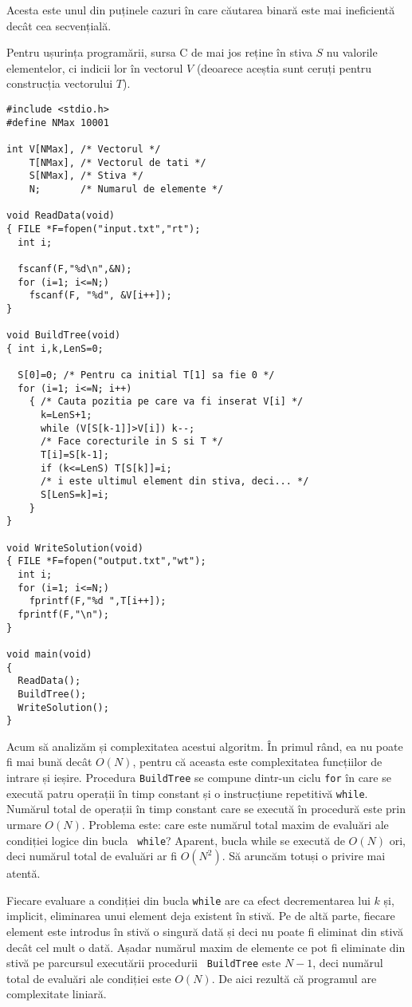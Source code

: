 Acesta este unul din puținele cazuri în care căutarea binară este mai
ineficientă decât cea secvențială.

Pentru ușurința programării, sursa C de mai jos reține în stiva $S$ nu
valorile elementelor, ci indicii lor în vectorul $V$ (deoarece aceștia sunt
ceruți pentru construcția vectorului $T$).

\begin{verbatim}
#include <stdio.h>
#define NMax 10001

int V[NMax], /* Vectorul */
    T[NMax], /* Vectorul de tati */
    S[NMax], /* Stiva */
    N;       /* Numarul de elemente */

void ReadData(void)
{ FILE *F=fopen("input.txt","rt");
  int i;

  fscanf(F,"%d\n",&N);
  for (i=1; i<=N;)
    fscanf(F, "%d", &V[i++]);
}

void BuildTree(void)
{ int i,k,LenS=0;

  S[0]=0; /* Pentru ca initial T[1] sa fie 0 */
  for (i=1; i<=N; i++)
    { /* Cauta pozitia pe care va fi inserat V[i] */
      k=LenS+1;
      while (V[S[k-1]]>V[i]) k--;
      /* Face corecturile in S si T */
      T[i]=S[k-1];
      if (k<=LenS) T[S[k]]=i;
      /* i este ultimul element din stiva, deci... */
      S[LenS=k]=i;
    }
}

void WriteSolution(void)
{ FILE *F=fopen("output.txt","wt");
  int i;
  for (i=1; i<=N;)
    fprintf(F,"%d ",T[i++]);
  fprintf(F,"\n");
}

void main(void)
{
  ReadData();
  BuildTree();
  WriteSolution();
}
\end{verbatim}

Acum să analizăm și complexitatea acestui algoritm. În primul rând, ea nu
poate fi mai bună decât $O(N)$, pentru că aceasta este complexitatea
funcțiilor de intrare și ieșire. Procedura {\tt BuildTree} se compune dintr-un
ciclu {\tt for} în care se execută patru operații în timp constant și o
instrucțiune repetitivă {\tt while}. Numărul total de operații în timp
constant care se execută în procedură este prin urmare $O(N)$. Problema este:
care este numărul total maxim de evaluări ale condiției logice din bucla {\tt
  while}? Aparent, bucla while se execută de $O(N)$ ori, deci numărul total de
evaluări ar fi $O(N^2)$. Să aruncăm totuși o privire mai atentă.

Fiecare evaluare a condiției din bucla {\tt while} are ca efect decrementarea
lui $k$ și, implicit, eliminarea unui element deja existent în stivă. Pe de
altă parte, fiecare element este introdus în stivă o singură dată și deci nu
poate fi eliminat din stivă decât cel mult o dată. Așadar numărul maxim de
elemente ce pot fi eliminate din stivă pe parcursul executării procedurii {\tt
  BuildTree} este $N-1$, deci numărul total de evaluări ale condiției este
$O(N)$. De aici rezultă că programul are complexitate liniară.
